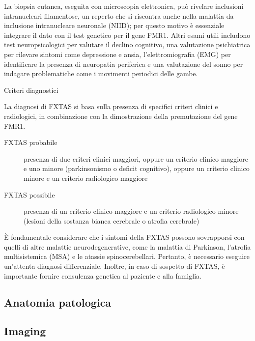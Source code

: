 La biopsia cutanea, eseguita con microscopia elettronica, può rivelare inclusioni intranucleari filamentose, un reperto che si riscontra anche nella malattia da inclusione intranucleare neuronale (NIID); per questo motivo è essenziale integrare il dato con il test genetico per il gene FMR1. Altri esami utili includono test neuropsicologici per valutare il declino cognitivo, una valutazione psichiatrica per rilevare sintomi come depressione e ansia, l'elettromiografia (EMG) per identificare la presenza di neuropatia periferica e una valutazione del sonno per indagare problematiche come i movimenti periodici delle gambe.
\begin{TitoloIntro}[colbacktitle=red]{Criteri diagnostici}
{
La diagnosi di FXTAS si basa sulla presenza di specifici criteri clinici e radiologici, in combinazione con la dimostrazione della premutazione del gene FMR1.
\begin{description}
\item[FXTAS probabile]{presenza di due criteri clinici maggiori, oppure un criterio clinico maggiore e uno minore (parkinsonismo o deficit cognitivo), oppure un criterio clinico minore e un criterio radiologico maggiore}
\item[FXTAS possibile]{presenza di un criterio clinico maggiore e un criterio radiologico minore (lesioni della sostanza bianca cerebrale o atrofia cerebrale)}
\end{description}
}
\end{TitoloIntro}
È fondamentale considerare che i sintomi della FXTAS possono sovrapporsi con quelli di altre malattie neurodegenerative, come la malattia di Parkinson, l'atrofia multisistemica (MSA) e le atassie spinocerebellari. Pertanto, è necessario eseguire un'attenta diagnosi differenziale. Inoltre, in caso di sospetto di FXTAS, è importante fornire consulenza genetica al paziente e alla famiglia.

\subsection{Anatomia patologica}

\subsection{Imaging}

